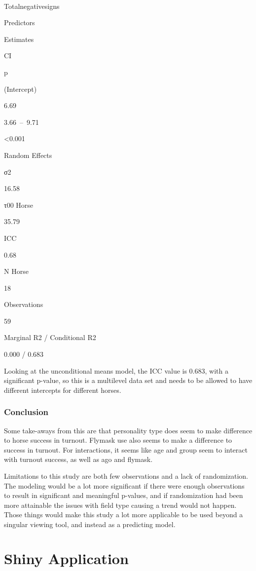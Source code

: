 \documentclass[
]{article}
\begin{document}
~

Totalnegativesigns

Predictors

Estimates

CI

p

(Intercept)

6.69

3.66~--~9.71

\textless0.001

Random Effects

σ2

16.58

τ00 Horse

35.79

ICC

0.68

N Horse

18

Observations

59

Marginal R2 / Conditional R2

0.000 / 0.683

Looking at the unconditional means model, the ICC value is 0.683, with a
significant p-value, so this is a multilevel data set and needs to be
allowed to have different intercepts for different horses.

\hypertarget{conclusion}{%
\subsubsection{Conclusion}\label{conclusion}}

Some take-aways from this are that personality type does seem to make
difference to horse success in turnout. Flymask use also seems to make a
difference to success in turnout. For interactions, it seems like age
and group seem to interact with turnout success, as well as ago and
flymask.

Limitations to this study are both few observations and a lack of
randomization. The modeling would be a lot more significant if there
were enough observations to result in significant and meaningful
p-values, and if randomization had been more attainable the issues with
field type causing a trend would not happen. Those things would make
this study a lot more applicable to be used beyond a singular viewing
tool, and instead as a predicting model.

\hypertarget{shiny-application}{%
\section{Shiny Application}\label{shiny-application}}
\end{document}
